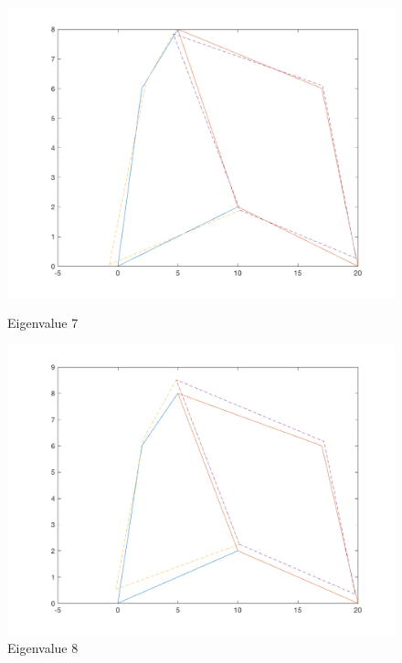 \documentclass[11pt]{amsart}
\begin{document}
\begin{figure}[H]
\begin{minipage}[b]{0.5\linewidth}
    \centering
    \includegraphics[width=.5\linewidth]{eigenvectors/eigenvector_7_redint.png} 
    \caption{Eigenvalue 7} 
    \vspace{4ex}
  \end{minipage}%
  \begin{minipage}[b]{0.5\linewidth}
    \centering
    \includegraphics[width=.5\linewidth]{eigenvectors/eigenvector_8_redint.png} 
    \caption{Eigenvalue 8} 
    \vspace{4ex}
  \end{minipage} 
\end{figure}
\end{document}
